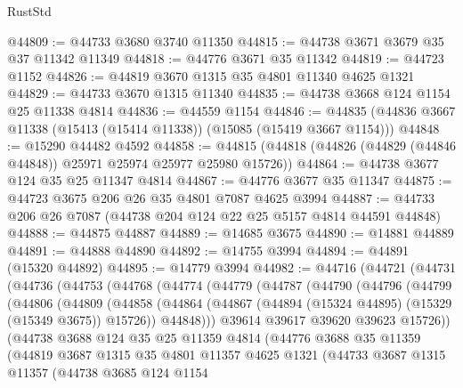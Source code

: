 \begin{lexlean}{RustStd}
\begin{coremodule}
@44809 := @44733 @3680 @3740 @11350
@44815 := @44738 @3671 @3679 @35 @37 @11342 @11349
@44818 := @44776 @3671 @35 @11342
@44819 := @44723 @1152
@44826 := @44819 @3670 @1315 @35 @4801 @11340 @4625 @1321
@44829 := @44733 @3670 @1315 @11340
@44835 := @44738 @3668 @124 @1154 @25 @11338 @4814
@44836 := @44559 @1154
@44846 := @44835 (@44836 @3667 @11338 (@15413 (@15414 @11338)) (@15085 (@15419 @3667 @1154)))
@44848 := @15290 @44482 @4592
@44858 := @44815 (@44818 (@44826 (@44829 (@44846 @44848)) @25971 @25974 @25977 @25980 @15726))
@44864 := @44738 @3677 @124 @35 @25 @11347 @4814
@44867 := @44776 @3677 @35 @11347
@44875 := @44723 @3675 @206 @26 @35 @4801 @7087 @4625 @3994
@44887 := @44733 @206 @26 @7087 (@44738 @204 @124 @22 @25 @5157 @4814 @44591 @44848)
@44888 := @44875 @44887
@44889 := @14685 @3675
@44890 := @14881 @44889
@44891 := @44888 @44890
@44892 := @14755 @3994
@44894 := @44891 (@15320 @44892)
@44895 := @14779 @3994
@44982 := @44716
    (@44721
      (@44731
        (@44736
          (@44753
            (@44768
              (@44774
                (@44779
                  (@44787
                    (@44790
                      (@44796
                        (@44799
                          (@44806
                            (@44809
                              (@44858
                                (@44864
                                  (@44867 (@44894 (@15324 @44895) (@15329 (@15349 @3675)) @15726))
                                  @44848)))
                            @39614
                            @39617
                            @39620
                            @39623
                            @15726))
                        (@44738
                          @3688
                          @124
                          @35
                          @25
                          @11359
                          @4814
                          (@44776
                            @3688
                            @35
                            @11359
                            (@44819
                              @3687
                              @1315
                              @35
                              @4801
                              @11357
                              @4625
                              @1321
                              (@44733
                                @3687
                                @1315
                                @11357
                                (@44738
                                  @3685
                                  @124
                                  @1154

\end{coremodule}
\end{lexlean}
